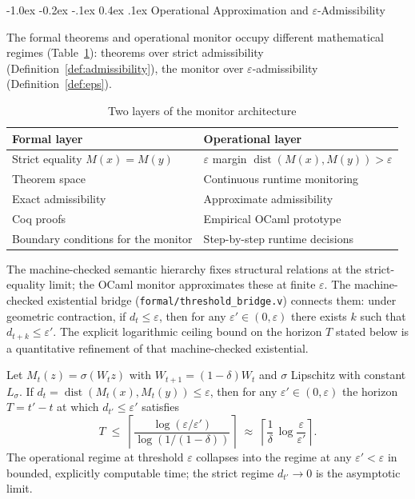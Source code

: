 \documentclass{llncs}
\makeatletter
\renewcommand\subsection{\@startsection{subsection}{2}{\z@}%
  {-1.0ex \@plus -0.2ex \@minus -.1ex}%
  {0.4ex \@plus .1ex}%
  {\normalfont\normalsize\bfseries}}
\DeclareMathOperator{\dist}{dist}
\makeatother
\begin{document}
\subsection{Operational Approximation and $\varepsilon$-Admissibility}
\label{sec:opapprox}

The formal theorems and operational monitor occupy different
mathematical regimes (Table~\ref{tab:layers}): theorems over strict
admissibility (Definition~\ref{def:admissibility}), the monitor over
$\varepsilon$-admissibility (Definition~\ref{def:eps}).

\begin{table}[tbp]
\centering
\caption{Two layers of the monitor architecture}
\label{tab:layers}
\small
\begin{tabular}{ll}
\toprule
\textbf{Formal layer} & \textbf{Operational layer} \\
\midrule
Strict equality $M(x) = M(y)$       & $\varepsilon$ margin $\dist(M(x),M(y)) > \varepsilon$ \\
Theorem space                       & Continuous runtime monitoring \\
Exact admissibility                 & Approximate admissibility \\
Coq proofs                          & Empirical OCaml prototype \\
Boundary conditions for the monitor & Step-by-step runtime decisions \\
\bottomrule
\end{tabular}
\end{table}

The machine-checked semantic hierarchy fixes structural relations at the
strict-equality limit; the OCaml monitor approximates these at finite
$\varepsilon$. The machine-checked existential bridge
(\texttt{formal/\allowbreak{}threshold\_bridge.v}) connects them: under geometric
contraction, if $d_t \leq \varepsilon$, then for any $\varepsilon' \in
(0, \varepsilon)$ there exists $k$ such that $d_{t+k} \leq \varepsilon'$.
The explicit logarithmic ceiling bound on the horizon $T$ stated below
is a quantitative refinement of that machine-checked existential.

\begin{lemma}
\label{lem:opbound}
Let $M_t(z) = \sigma(W_t z)$ with $W_{t+1} = (1-\delta) W_t$ and
$\sigma$ Lipschitz with constant $L_\sigma$. If $d_t = \dist(M_t(x),
M_t(y)) \leq \varepsilon$, then for any $\varepsilon' \in (0,
\varepsilon)$ the horizon $T = t' - t$ at which $d_{t'} \leq
\varepsilon'$ satisfies
\[
  T \;\leq\;
    \left\lceil
      \frac{\log(\varepsilon / \varepsilon')}{\log(1 / (1-\delta))}
    \right\rceil
    \;\approx\;
    \left\lceil
      \frac{1}{\delta}\,\log\!\frac{\varepsilon}{\varepsilon'}
    \right\rceil .
\]
The operational regime at threshold $\varepsilon$ collapses into the
regime at any $\varepsilon' < \varepsilon$ in bounded, explicitly
computable time; the strict regime $d_{t'} \to 0$ is the asymptotic
limit.
\end{lemma}
\end{document}
